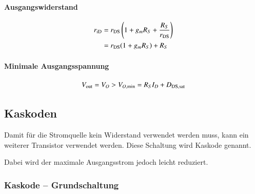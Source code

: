 \begin{minipage}[t]{0.5\columnwidth}
    \paragraph{Ausgangswiderstand}

    \vspace{-0.4cm}

    \begin{align*}
         r_{\rm iD} &= r_{\rm DS} \left( 1 + g_m R_S + \frac{R_S}{r_{\rm DS}} \right) \\ 
                    &= r_{\rm DS} (1 + g_m R_S) + R_S
    \end{align*}
            

    \paragraph{Minimale Ausgangsspannung}

    \vspace{-0.2cm}

    \[
        V_{\rm out} = V_O > V_{O , \rm min} = R_S I_D + D_{\rm DS, sat}
    \]
\end{minipage}


\subsection{Kaskoden}
Damit für die Stromquelle kein Widerstand verwendet werden muss, kann ein weiterer Transistor verwendet werden. Diese Schaltung wird Kaskode genannt.

Dabei wird der maximale Ausgangsstrom jedoch leicht reduziert.


\subsubsection{Kaskode -- Grundschaltung}
\label{Kaskode -- Grundschaltung}


